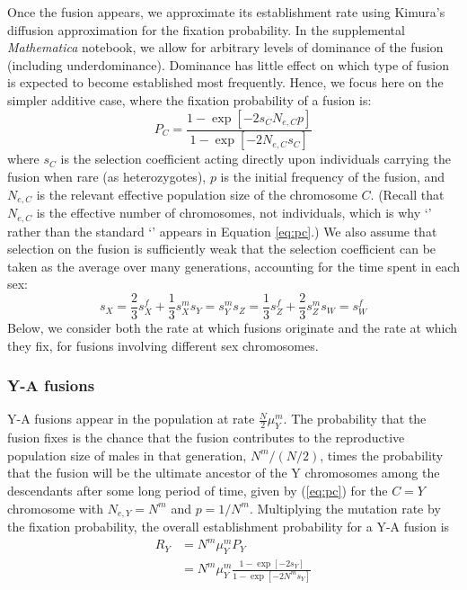 \documentclass[12pt,twoside]{article}
\begin{document}
Once the fusion appears, we approximate its establishment rate using Kimura's \citeyearpar{Kimura1962} diffusion approximation for the fixation probability. In the supplemental \emph{Mathematica} notebook, we allow for arbitrary levels of dominance of the fusion (including underdominance). Dominance has little effect on which type of fusion is expected to become established most frequently. Hence, we focus here on the simpler additive case, where the fixation probability of a fusion is:
\begin{equation}\label{eq:pc}
P_C = \frac{\text{1} - \exp[-\text{2}s_C N_{e,C}p]}{\text{1} - \exp[-\text{2}N_{e,C}s_C ]}
\end{equation}
where $s_C$ is the selection coefficient acting directly upon individuals carrying the fusion when rare (as heterozygotes), $p$ is the initial frequency of the fusion, and $N_{e,C}$ is the relevant effective population size of the chromosome $C$. (Recall that $N_{e,C}$ is the effective number of chromosomes, not individuals, which is why `' rather than the standard `' appears in Equation \ref{eq:pc}.) We also assume that selection on the fusion is sufficiently weak that the selection coefficient can be taken as the average over many generations, accounting for the time spent in each sex:
\begin{subequations}
\begin{equation}
s_X = \frac{\text{2}}{\text{3}}s^f_X + \frac{\text{1}}{\text{3}}s^m_X
\end{equation}
\begin{equation}
s_Y = s^m_Y
\end{equation}
\begin{equation}
s_Z = \frac{\text{1}}{\text{3}}s^f_Z + \frac{\text{2}}{\text{3}}s^m_Z
\end{equation}
\begin{equation}
s_W = s^f_W
\end{equation}
\end{subequations}
Below, we consider both the rate at which fusions originate and the rate at which they fix, for fusions involving different sex chromosomes.

\subsubsection{Y-A fusions}

Y-A fusions appear in the population at rate $\frac{N}{\text{2}}\mu^m_Y$. The probability that the fusion fixes is the chance that the fusion contributes to the reproductive population size of males in that generation, $N^m / (N/\text{2})$, times the probability that the fusion will be the ultimate ancestor of the Y chromosomes among the descendants after some long period of time, given by (\ref{eq:pc}) for the $C = Y$ chromosome with $N_{e,Y}=N^m$ and $p=\text{1}/N^m$. Multiplying the mutation rate by the fixation probability, the overall establishment probability for a Y-A fusion is
\begin{align}\label{eq:Ry}
R_Y &= N^m \mu^m_Y  P_Y \nonumber \\
&= N^m \mu^m_Y \frac{\text{1}-\exp[-\text{2}s_Y]}{\text{1}-\exp[-\text{2}N^ms_Y]}
\end{align}
\end{document}
